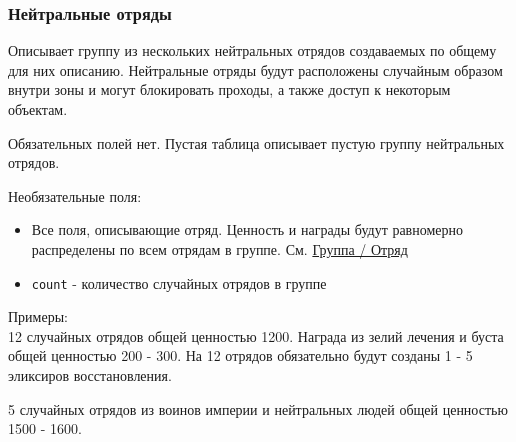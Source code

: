\subsubsection{Нейтральные отряды}
\label{neutralStacks}
Описывает группу из нескольких нейтральных отрядов создаваемых по общему для них описанию.
Нейтральные отряды будут расположены случайным образом внутри зоны и могут блокировать проходы, а также доступ к некоторым объектам.

Обязательных полей нет. Пустая таблица описывает пустую группу нейтральных отрядов.

Необязательные поля:
\begin{itemize}
\item Все поля, описывающие отряд. Ценность и награды будут равномерно распределены по всем отрядам в группе. См. \hyperref[group]{Группа / Отряд}
\item \texttt{count} - количество случайных отрядов в группе
\end{itemize}

Примеры:\\
12 случайных отрядов общей ценностью 1200.
Награда из зелий лечения и буста общей ценностью 200 - 300.
На 12 отрядов обязательно будут созданы  1 - 5 эликсиров восстановления.

\begin{figure}[H]

\end{figure}

5 случайных отрядов из воинов империи и нейтральных людей общей ценностью 1500 - 1600.

\begin{figure}[H]

\end{figure}